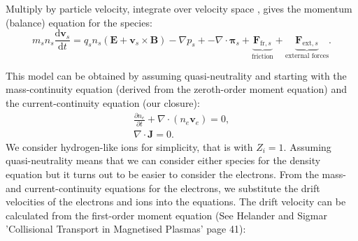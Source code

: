 \documentclass[12pt]{article}
\begin{document}
Multiply by particle velocity, integrate over velocity space , gives the momentum (balance) equation for the species:
%
\begin{equation}
    m_s n_s \frac{\mathrm{d} \bm{v}_s}{\mathrm{d} t} = q_s n_s (\bm{E} + \bm{v}_s \times \bm{B}) - \nabla p_s + - \nabla \cdot \bm{\pi}_s + \underbrace{\bm{F}_{\text{fr},s}}_\text{friction} + \underbrace{\bm{F}_{\text{ext},s}}_\text{external forces} .
\end{equation}

This model can be obtained by assuming quasi-neutrality and starting with
the mass-continuity equation (derived from the zeroth-order moment equation) and the current-continuity equation (our closure):
%
\begin{gather}
    \frac{\partial n_e}{\partial t} + \nabla \cdot (n_e \bm{v}_e) = 0 , \\
    \nabla \cdot \bm{J} = 0.
\end{gather}
%
We consider hydrogen-like ions for simplicity, that is with $Z_i  = 1$. Assuming quasi-neutrality means that we can consider either species for the density equation but it turns out to be easier to consider the electrons. From the mass- and current-continuity equations for the electrons, we substitute the drift velocities of the electrons and ions into the equations. The drift velocity can be calculated from the first-order moment equation (See Helander and Sigmar 'Collisional Transport in Magnetised Plasmas' page 41):
%
\end{document}
